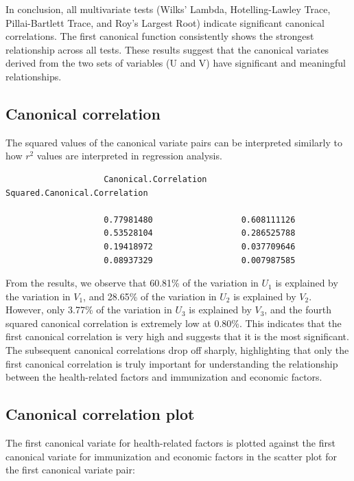 \documentclass[11pt]{article}
\begin{document}
			In conclusion, all multivariate tests (Wilks' Lambda, Hotelling-Lawley Trace, Pillai-Bartlett Trace, and Roy's Largest Root) indicate significant canonical correlations. The first canonical function consistently shows the strongest relationship across all tests. These results suggest that the canonical variates derived from the two sets of variables (U and V) have significant and meaningful relationships.
			
			
		\subsection{Canonical correlation}
			The squared values of the canonical variate pairs can be interpreted similarly to how $r^2$ values are interpreted in regression analysis.
			
			\begin{tcolorbox}[colback=white, colframe=white]
				\begin{verbatim}
					Canonical.Correlation      Squared.Canonical.Correlation
						
					0.77981480                  0.608111126			
					0.53528104                  0.286525788			
					0.19418972                  0.037709646			
					0.08937329                  0.007987585
				\end{verbatim}
			\end{tcolorbox}
				
				
			From the results, we observe that 60.81\% of the variation in $U_1$ is explained by the variation in $V_1$, and 28.65\% of the variation in $U_2$ is explained by $V_2$. However, only 3.77\% of the variation in $U_3$ is explained by $V_3$, and the fourth squared canonical correlation is extremely low at 0.80\%. This indicates that the first canonical correlation is very high and suggests that it is the most significant. The subsequent canonical correlations drop off sharply, highlighting that only the first canonical correlation is truly important for understanding the relationship between the health-related factors and immunization and economic factors.
				
		\subsection{Canonical correlation plot}
			The first canonical variate for health-related factors is plotted against the first canonical variate for immunization and economic factors in the scatter plot for the first canonical variate pair:
			
\end{document}
